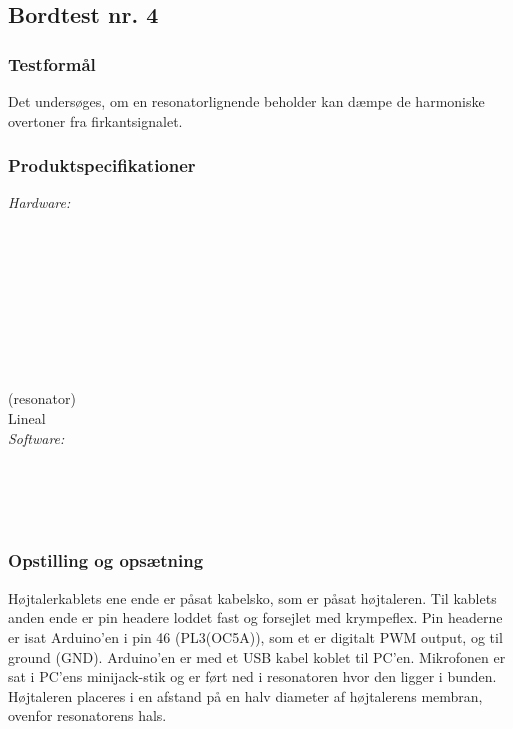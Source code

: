 		\subsection{Bordtest nr. 4} %
		\subsubsection{Testformål}
		Det undersøges, om en resonatorlignende beholder kan dæmpe de harmoniske overtoner fra firkantsignalet. 
		
		\subsubsection{Produktspecifikationer}
		
		\textit{Hardware:}\\
		\tores\\
		\\
		\kabelsko\\
		\pins\\
		\krympeflex\\
		\arduino\\
		\mikrofon\\
		\PC\\
		\usbkabel\\
		 (resonator)\\
		Lineal\\
	
		\textit{Software:}\\
		\labview\\
		\visa\\
		\vi\\
		\ardsw\\
		
		
		\subsubsection{Opstilling og opsætning}
		
		Højtalerkablets ene ende er påsat kabelsko, som er påsat højtaleren. Til kablets anden ende er pin headere loddet fast og forsejlet med krympeflex. Pin headerne er isat Arduino'en i pin 46 (PL3(OC5A)), som et er digitalt PWM output, og til ground (GND). 
		Arduino'en er med et USB kabel koblet til PC'en.	
		Mikrofonen er sat i PC'ens minijack-stik og er ført ned i resonatoren hvor den ligger i bunden. Højtaleren placeres i en afstand på en halv diameter af højtalerens membran, ovenfor resonatorens hals. 
		
